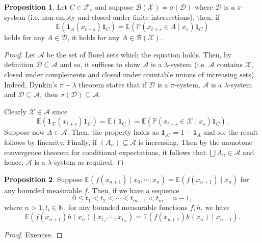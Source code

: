 \documentclass[]{article}
\theoremstyle{definition}
\theoremstyle{definition}
\newtheorem{proposition}{Proposition}[section]
\begin{document}
\begin{proposition}
  Let \(C \in \mathcal{F}_s\) and suppose \(\mathcal{B}(\mathcal{X}) = 
  \sigma(\mathcal{D})\) where 
  \(\mathcal{D}\) is a \(\pi\)-system (i.e. non-empty and closed under finite intersections), 
  then, if 
  \[\mathbb{E}(\mathbf{1}_A(x_{t + s}) \mathbf{1}_C) = 
    \mathbb{E}(\mathbb{P}(x_{t + s} \in A \mid x_s) \mathbf{1}_C)\] 
  holds for any \(A \in \mathcal{D}\), it holds for any \(A \in \mathcal{B}(\mathcal{X})\).
\end{proposition}
\begin{proof}
  Let \(\mathcal{A}\) be the set of Borel sets which the equation holds. Then, 
  by definition \(\mathcal{D} \subseteq \mathcal{A}\) and so, it suffices to show 
  \(\mathcal{A}\) is a \(\lambda\)-system (i.e. \(\mathcal{A}\) contains \(\mathcal{X}\), 
  closed under complements and closed under countable unions of increasing sets). 
  Indeed, Dynkin's \(\pi - \lambda\) theorem states that if \(\mathcal{D}\) is 
  a \(\pi\)-system, \(\mathcal{A}\) is a \(\lambda\)-system and 
  \(\mathcal{D} \subseteq \mathcal{A}\), then \(\sigma(\mathcal{D}) \subseteq \mathcal{A}\).

  Clearly \(\mathcal{X} \in \mathcal{A}\) since 
  \[\mathbb{E}(\mathbf{1}_{\mathcal{X}}(x_{t + s}) \mathbf{1}_C) = 
    \mathbb{E}(\mathbf{1}_C) = 
    \mathbb{E}(\mathbb{P}(x_{t + s} \in \mathcal{X} \mid x_s) \mathbf{1}_C).\]
  Suppose now \(A \in \mathcal{A}\). Then, the property holds as 
  \(\mathbf{1}_{A^c} = 1 - \mathbf{1}_A\) and so, the result follows by linearity.
  Finally, if \((A_n) \subseteq \mathcal{A}\) is increasing. Then by the 
  monotone convergence theorem for conditional expectations, it follows that 
  \(\bigcup A_n \in \mathcal{A}\) and hence, \(\mathcal{A}\) is a \(\lambda\)-system 
  as required.
\end{proof}

\begin{proposition}
  Suppose \(\mathbb{E}(f(x_{n + 1}) \mid x_0, \cdots, x_n) = \mathbb{E}(f(x_{n + 1}) \mid x_n)\)
  for any bounded measurable \(f\). Then, if we have a sequence 
  \[0 \le t_1 < t_2 < \cdots < t_{m - 1} < t_m = n - 1,\]
  where \(n > 1, t_i \in \mathbb{N}\), for any bounded measurable functions \(f, h\), 
  we have 
  \[\mathbb{E}(f(x_{n + 1})h(x_n) \mid x_{t_1}, \cdots, x_{t_m}) = 
    \mathbb{E}(f(x_{n + 1})h(x_n) \mid x_{n - 1}).\]
\end{proposition}
\begin{proof}
  Exercise.
\end{proof}
\end{document}
